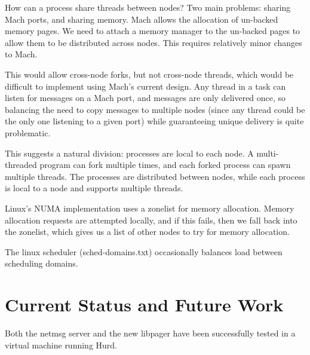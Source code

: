\documentclass{article}
\begin{document}
How can a process share threads between nodes?  Two main problems:
sharing Mach ports, and sharing memory.  Mach allows the allocation
of un-backed memory pages.  We need to attach a memory manager
to the un-backed pages to allow them to be distributed across nodes.
This requires relatively minor changes to Mach.

This would allow cross-node forks, but not cross-node threads, which
would be difficult to implement using Mach's current design.  Any
thread in a task can listen for messages on a Mach port, and messages
are only delivered once, so balancing the need to copy messages to
multiple nodes (since any thread could be the only one listening to a
given port) while guaranteeing unique delivery is quite problematic.

This suggests a natural division: processes are local to each node.  A
multi-threaded program can fork multiple times, and each forked
process can spawn multiple threads.  The processes are distributed
between nodes, while each process is local to a node and supports
multiple threads.

Linux's NUMA implementation uses a zonelist for memory allocation.
Memory allocation requests are attempted locally, and if this fails,
then we fall back into the zonelist, which gives us a list of other
nodes to try for memory allocation.

The linux scheduler (sched-domains.txt) occasionally balances
load between scheduling domains.


\section{Current Status and Future Work}

Both the netmsg server and the new libpager have been successfully
tested in a virtual machine running Hurd.
\end{document}
